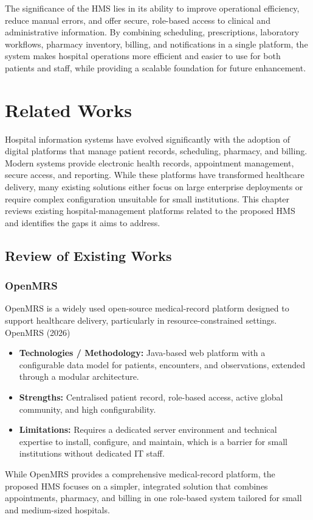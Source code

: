 \documentclass[12pt,a4paper]{report}
\begin{document}
The significance of the HMS lies in its ability to improve operational efficiency,
reduce manual errors, and offer secure, role-based access to clinical and
administrative information. By combining scheduling, prescriptions, laboratory
workflows, pharmacy inventory, billing, and notifications in a single platform, the
system makes hospital operations more efficient and easier to use for both patients
and staff, while providing a scalable foundation for future enhancement.

\chapter{Related Works}
Hospital information systems have evolved significantly with the adoption of digital
platforms that manage patient records, scheduling, pharmacy, and billing. Modern
systems provide electronic health records, appointment management, secure access, and
reporting. While these platforms have transformed healthcare delivery, many existing
solutions either focus on large enterprise deployments or require complex configuration
unsuitable for small institutions. This chapter reviews existing hospital-management
platforms related to the proposed HMS and identifies the gaps it aims to address.

\section{Review of Existing Works}

\subsection*{OpenMRS}
OpenMRS is a widely used open-source medical-record platform designed to support
healthcare delivery, particularly in resource-constrained settings. OpenMRS (2026)
\begin{itemize}[leftmargin=1.4em, itemsep=1pt]
  \item \textbf{Technologies / Methodology:} Java-based web platform with a
        configurable data model for patients, encounters, and observations, extended
        through a modular architecture.
  \item \textbf{Strengths:} Centralised patient record, role-based access, active
        global community, and high configurability.
  \item \textbf{Limitations:} Requires a dedicated server environment and technical
        expertise to install, configure, and maintain, which is a barrier for small
        institutions without dedicated IT staff.
\end{itemize}
While OpenMRS provides a comprehensive medical-record platform, the proposed HMS
focuses on a simpler, integrated solution that combines appointments, pharmacy, and
billing in one role-based system tailored for small and medium-sized hospitals.
\end{document}
